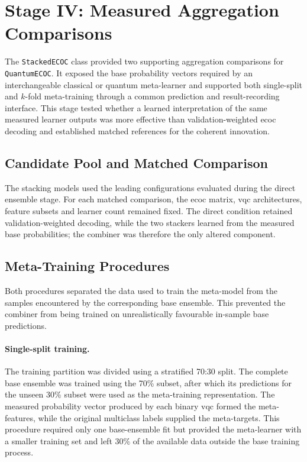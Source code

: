 \documentclass[]{UCD_CS_MSc_AAI_Report}
\begin{document}
\section{Stage IV: Measured Aggregation Comparisons}
\label{sec:method-stacking}

The \texttt{StackedECOC} class provided two supporting aggregation comparisons for \texttt{QuantumECOC}. It exposed the base probability vectors required by an interchangeable classical or quantum meta-learner and supported both single-split and $k$-fold meta-training through a common prediction and result-recording interface. This stage tested whether a learned interpretation of the same measured learner outputs was more effective than validation-weighted \ac{ecoc} decoding and established matched references for the coherent innovation.

\subsection{Candidate Pool and Matched Comparison}

The stacking models used the leading configurations evaluated during the direct ensemble stage. For each matched comparison, the \ac{ecoc} matrix, \ac{vqc} architectures, feature subsets and learner count remained fixed. The direct condition retained validation-weighted decoding, while the two stackers learned from the measured base probabilities; the combiner was therefore the only altered component.

\subsection{Meta-Training Procedures}

Both procedures separated the data used to train the meta-model from the samples encountered by the corresponding base ensemble. This prevented the combiner from being trained on unrealistically favourable in-sample base predictions.

\paragraph{Single-split training.} The training partition was divided using a stratified 70:30 split. The complete base ensemble was trained using the 70\% subset, after which its predictions for the unseen 30\% subset were used as the meta-training representation. The measured probability vector produced by each binary \ac{vqc} formed the meta-features, while the original multiclass labels supplied the meta-targets. This procedure required only one base-ensemble fit but provided the meta-learner with a smaller training set and left 30\% of the available data outside the base training process.
\end{document}
